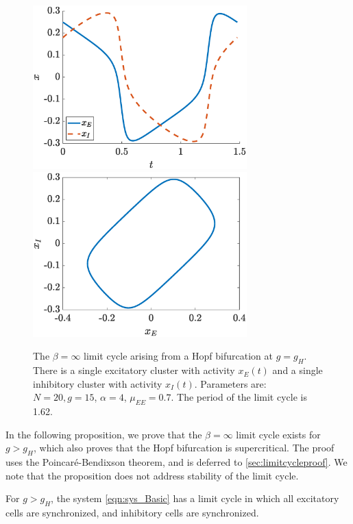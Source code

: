 \documentclass[reqno]{siamonline190516}
\begin{document}
\begin{figure}
    \centering
    \includegraphics[width=8.25cm]{limitcycle1.eps}\hspace{-0.5cm}
    \includegraphics[width=8.25cm]{limitcycle2.eps}
    \caption{The $\beta = \infty$ limit cycle arising from a Hopf bifurcation at $g = g_H$. There is a single excitatory cluster with activity $x_E(t)$ and a single inhibitory cluster with activity $x_I(t)$. Parameters are: $N=20, g = 15$, $\alpha = 4$, $\mu_{EE}= 0.7$. The period of the limit cycle is 1.62.} 
    \label{fig:limitcycleorigin}
\end{figure}

In the following proposition, we prove that the $\beta=\infty$ limit cycle exists for $g > g_H$, which also proves that the Hopf bifurcation is supercritical. The proof uses the Poincar\'e-Bendixson theorem, and is deferred to \cref{sec:limitcycleproof}. We note that the proposition does not address stability of the limit cycle.

\begin{proposition}\label{prop:limitcycle}
For $g > g_H$, the system \cref{eqn:sys_Basic} has a limit cycle in which all excitatory cells are synchronized, and inhibitory cells are synchronized.
\end{proposition}
\end{document}
